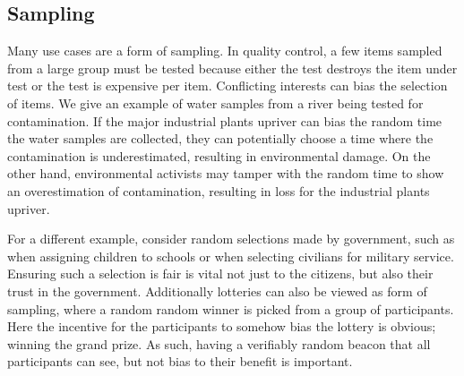 \subsection{Sampling}

Many use cases are a form of sampling.  In quality control, a few items sampled from a large group must be tested because either the test destroys the item under test or the test is expensive per item. Conflicting interests can bias the selection of items. We give an example of water samples from a river being tested for contamination. If the major industrial plants upriver can bias the random time the water samples are collected, they can potentially choose a time where the contamination is underestimated, resulting in environmental damage. On the other hand, environmental activists may tamper with the random time to show an overestimation of contamination, resulting in loss for the industrial plants upriver.

For a different example, consider random selections made by government, such as when assigning children to schools or when selecting civilians for military service. Ensuring such a selection is fair is vital not just to the citizens, but also their trust in the government. 
Additionally lotteries can also be viewed as form of sampling, where a random random winner is picked from a group of participants. Here the incentive for the participants to somehow bias the lottery is obvious; winning the grand prize. As such, having a verifiably random beacon that all participants can see, but not bias to their benefit is important. 

